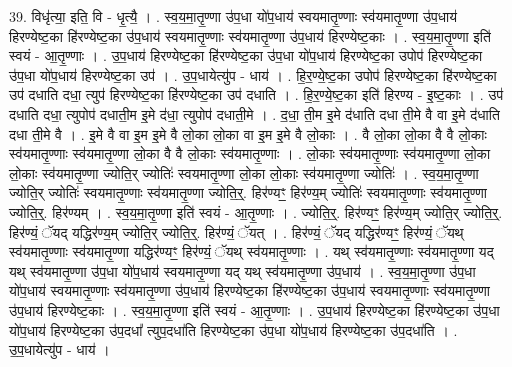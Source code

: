 \documentclass[17pt]{extarticle}
\begin{document}
39. विधृ॑त्या॒ इति॒ वि - धृ॒त्यै॒ । . स्व॒य॒मा॒तृ॒ण्णा उ॑प॒धा यो॑प॒धाय॑ स्वयमातृ॒ण्णाः स्व॑यमातृ॒ण्णा उ॑प॒धाय॑ हिरण्येष्ट॒का हि॑रण्येष्ट॒का उ॑प॒धाय॑ स्वयमातृ॒ण्णाः स्व॑यमातृ॒ण्णा उ॑प॒धाय॑ हिरण्येष्ट॒काः । . स्व॒य॒मा॒तृ॒ण्णा इति॑ स्वयं - आ॒तृ॒ण्णाः । . उ॒प॒धाय॑ हिरण्येष्ट॒का हि॑रण्येष्ट॒का उ॑प॒धा यो॑प॒धाय॑ हिरण्येष्ट॒का उपोप॑ हिरण्येष्ट॒का उ॑प॒धा यो॑प॒धाय॑ हिरण्येष्ट॒का उप॑ । . उ॒प॒धायेत्यु॑प - धाय॑ । . हि॒र॒ण्ये॒ष्ट॒का उपोप॑ हिरण्येष्ट॒का हि॑रण्येष्ट॒का उप॑ दधाति दधा॒ त्युप॑ हिरण्येष्ट॒का हि॑रण्येष्ट॒का उप॑ दधाति । . हि॒र॒ण्ये॒ष्ट॒का इति॑ हिरण्य - इ॒ष्ट॒काः । . उप॑ दधाति दधा॒ त्युपोप॑ दधाती॒म इ॒मे द॑धा॒ त्युपोप॑ दधाती॒मे । . द॒धा॒ ती॒म इ॒मे द॑धाति दधा ती॒मे वै वा इ॒मे द॑धाति दधा ती॒मे वै । . इ॒मे वै वा इ॒म इ॒मे वै लो॒का लो॒का वा इ॒म इ॒मे वै लो॒काः । . वै लो॒का लो॒का वै वै लो॒काः स्व॑यमातृ॒ण्णाः स्व॑यमातृ॒ण्णा लो॒का वै वै लो॒काः स्व॑यमातृ॒ण्णाः । . लो॒काः स्व॑यमातृ॒ण्णाः स्व॑यमातृ॒ण्णा लो॒का लो॒काः स्व॑यमातृ॒ण्णा ज्योति॒र् ज्योतिः॑ स्वयमातृ॒ण्णा लो॒का लो॒काः स्व॑यमातृ॒ण्णा ज्योतिः॑ । . स्व॒य॒मा॒तृ॒ण्णा ज्योति॒र् ज्योतिः॑ स्वयमातृ॒ण्णाः स्व॑यमातृ॒ण्णा ज्योति॒र्॒. हिर॑ण्यꣳ॒॒ हिर॑ण्य॒म् ज्योतिः॑ स्वयमातृ॒ण्णाः स्व॑यमातृ॒ण्णा ज्योति॒र्॒. हिर॑ण्यम् । . स्व॒य॒मा॒तृ॒ण्णा इति॑ स्वयं - आ॒तृ॒ण्णाः । . ज्योति॒र्॒. हिर॑ण्यꣳ॒॒ हिर॑ण्य॒म् ज्योति॒र् ज्योति॒र्॒. हिर॑ण्यं॒ ॅयद् यद्धिर॑ण्य॒म् ज्योति॒र् ज्योति॒र्॒. हिर॑ण्यं॒ ॅयत् । . हिर॑ण्यं॒ ॅयद् यद्धिर॑ण्यꣳ॒॒ हिर॑ण्यं॒ ॅयथ् स्व॑यमातृ॒ण्णाः स्व॑यमातृ॒ण्णा यद्धिर॑ण्यꣳ॒॒ हिर॑ण्यं॒ ॅयथ् स्व॑यमातृ॒ण्णाः । . यथ् स्व॑यमातृ॒ण्णाः स्व॑यमातृ॒ण्णा यद् यथ् स्व॑यमातृ॒ण्णा उ॑प॒धा यो॑प॒धाय॑ स्वयमातृ॒ण्णा यद् यथ् स्व॑यमातृ॒ण्णा उ॑प॒धाय॑ । . स्व॒य॒मा॒तृ॒ण्णा उ॑प॒धा यो॑प॒धाय॑ स्वयमातृ॒ण्णाः स्व॑यमातृ॒ण्णा उ॑प॒धाय॑ हिरण्येष्ट॒का हि॑रण्येष्ट॒का उ॑प॒धाय॑ स्वयमातृ॒ण्णाः स्व॑यमातृ॒ण्णा उ॑प॒धाय॑ हिरण्येष्ट॒काः । . स्व॒य॒मा॒तृ॒ण्णा इति॑ स्वयं - आ॒तृ॒ण्णाः । . उ॒प॒धाय॑ हिरण्येष्ट॒का हि॑रण्येष्ट॒का उ॑प॒धा यो॑प॒धाय॑ हिरण्येष्ट॒का उ॑प॒दधा᳚ त्युप॒दधा॑ति हिरण्येष्ट॒का उ॑प॒धा यो॑प॒धाय॑ हिरण्येष्ट॒का उ॑प॒दधा॑ति । . उ॒प॒धायेत्यु॑प - धाय॑ । \newline
\pagebreak
{}
\end{document}
